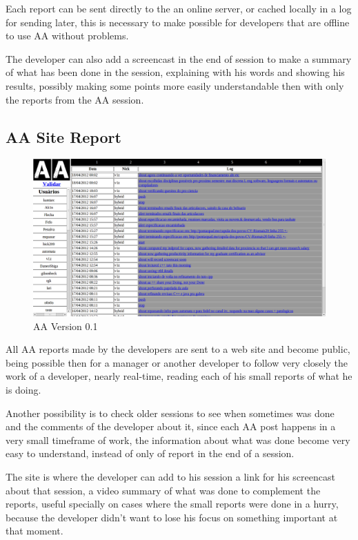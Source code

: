 \documentclass[letterpaper]{article}
\begin{document}
Each report can be sent directly to the an online server, or cached locally in
a log for sending later, this is necessary to make possible for developers that are
offline to use AA without problems.

The developer can also add a screencast in the end of session to make a summary
of what has been done in the session, explaining with his words and showing his
results, possibly making some points more easily understandable then with only
the reports from the AA session.

\subsection{AA Site Report}

\begin{figure}
\begin{center}
   \includegraphics[width=0.8\linewidth,keepaspectratio=true]{figs/aa-0.1.png}
\end{center}
   \caption{
   AA Version 0.1
   }
\label{fig:mm}
\end{figure}

All AA reports made by the developers are sent to a web site and become public,
being possible then for a manager or another developer to follow very closely
the work of a developer, nearly real-time, reading each of his small reports of
what he is doing.

Another possibility is to check older sessions to see when sometimes was done
and the comments of the developer about it, since each AA post happens in a
very small timeframe of work, the information about what was done become very
easy to understand, instead of only of report in the end of a session.

The site is where the developer can add to his session a link for his
screencast about that session, a video summary of what was done to complement
the reports, useful specially on cases where the small reports were done in a
hurry, because the developer didn't want to lose his focus on something
important at that moment.
\end{document}
